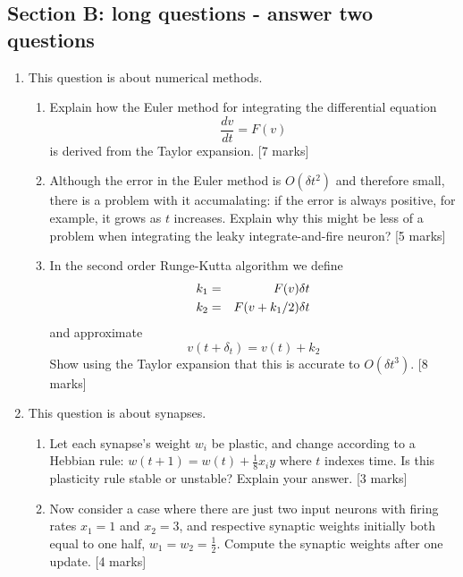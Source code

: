 \documentclass[a4paper,12pt]{article}
\newif\ifsoln
\begin{document}
\subsection*{Section B: long questions - answer two questions}

\begin{enumerate}


\item This question is about numerical methods. 
\begin{enumerate}
\item Explain how the Euler method for integrating the differential equation 
$$\frac{dv}{dt}=F(v)$$
is derived from the Taylor expansion. [7 marks]
\item Although the error in the Euler method is $O(\delta t^2)$ and
  therefore small, there is a problem with it accumalating: if the
  error is always positive, for example, it grows as $t$
  increases. Explain why this might be less of a problem when
  integrating the leaky integrate-and-fire neuron? [5 marks]
\item In the second order Runge-Kutta algorithm we define
\begin{eqnarray*}
k_1&=&F(v)\delta t\cr
k_2&=&F(v+k_1/2)\delta t
\end{eqnarray*}
and approximate
$$
v(t+\delta_t)=v(t)+k_2
$$
Show using the Taylor expansion that this is accurate to $O(\delta t^3)$. [8 marks]
\end{enumerate}

\ifsoln Solution:  a) and c) see notes; b) because of the reset. \fi

 
\item This question is about synapses.

\begin{enumerate}

\item Let each synapse's weight $w_i$ be plastic, and change according to a Hebbian rule: $w(t+1) = w(t) + \frac{1}{8} x_i y$ where $t$ indexes time. Is this plasticity rule stable or unstable? Explain your answer. [3 marks]

 

\item Now consider a case where there are just two input neurons with firing rates $x_1 = 1$ and $x_2 = 3$, and respective synaptic weights initially both equal to one half, $w_1 = w_2 = \frac{1}{2}$. Compute the synaptic weights after one update. [4 marks]

 


\end{enumerate}
\end{enumerate}
\end{document}
